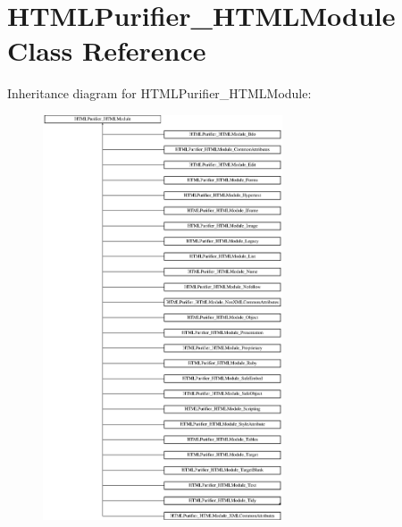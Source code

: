 \hypertarget{classHTMLPurifier__HTMLModule}{\section{H\+T\+M\+L\+Purifier\+\_\+\+H\+T\+M\+L\+Module Class Reference}
\label{classHTMLPurifier__HTMLModule}
}
Inheritance diagram for H\+T\+M\+L\+Purifier\+\_\+\+H\+T\+M\+L\+Module\+:\begin{figure}[H]
\begin{center}
\leavevmode
\includegraphics[height=12.000000cm]{classHTMLPurifier__HTMLModule}
\end{center}
\end{figure}

